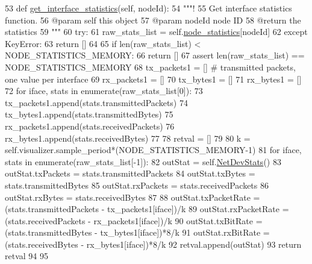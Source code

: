 \begin{DoxyCode}
53     \textcolor{keyword}{def }\hyperlink{classinterface__statistics_1_1StatisticsCollector_a018f174d867b4e4b58622f40e875f351}{get\_interface\_statistics}(self, nodeId):
54         \textcolor{stringliteral}{"""!}
55 \textcolor{stringliteral}{        Get interface statistics function.}
56 \textcolor{stringliteral}{        @param self this object}
57 \textcolor{stringliteral}{        @param nodeId node ID}
58 \textcolor{stringliteral}{        @return the statistics}
59 \textcolor{stringliteral}{        """}
60         \textcolor{keywordflow}{try}:
61             raw\_stats\_list = self.\hyperlink{classinterface__statistics_1_1StatisticsCollector_a0e9aacae75826dc6cc57b063d71bc3d1}{node\_statistics}[nodeId]
62         \textcolor{keywordflow}{except} KeyError:
63             \textcolor{keywordflow}{return} []
64         
65         \textcolor{keywordflow}{if} len(raw\_stats\_list) < NODE\_STATISTICS\_MEMORY:
66             \textcolor{keywordflow}{return} []
67         \textcolor{keyword}{assert} len(raw\_stats\_list) == NODE\_STATISTICS\_MEMORY
68         tx\_packets1 = [] \textcolor{comment}{# transmitted packets, one value per interface}
69         rx\_packets1 = []
70         tx\_bytes1 = []
71         rx\_bytes1 = []
72         \textcolor{keywordflow}{for} iface, stats \textcolor{keywordflow}{in} enumerate(raw\_stats\_list[0]):
73             tx\_packets1.append(stats.transmittedPackets)
74             tx\_bytes1.append(stats.transmittedBytes)
75             rx\_packets1.append(stats.receivedPackets)
76             rx\_bytes1.append(stats.receivedBytes)
77 
78         retval = []
79 
80         k = self.visualizer.sample\_period*(NODE\_STATISTICS\_MEMORY-1)
81         \textcolor{keywordflow}{for} iface, stats \textcolor{keywordflow}{in} enumerate(raw\_stats\_list[-1]):
82             outStat = self.\hyperlink{classinterface__statistics_1_1StatisticsCollector_1_1NetDevStats}{NetDevStats}()
83             outStat.txPackets = stats.transmittedPackets
84             outStat.txBytes = stats.transmittedBytes
85             outStat.rxPackets = stats.receivedPackets
86             outStat.rxBytes = stats.receivedBytes
87             
88             outStat.txPacketRate = (stats.transmittedPackets - tx\_packets1[iface])/k
89             outStat.rxPacketRate = (stats.receivedPackets - rx\_packets1[iface])/k
90             outStat.txBitRate = (stats.transmittedBytes - tx\_bytes1[iface])*8/k
91             outStat.rxBitRate = (stats.receivedBytes - rx\_bytes1[iface])*8/k
92             retval.append(outStat)
93         \textcolor{keywordflow}{return} retval
94 
95 
\end{DoxyCode}
